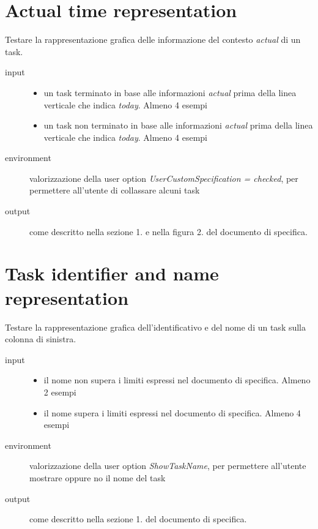 \section{Actual time representation}
Testare la rappresentazione grafica delle informazione del contesto
\emph{actual} di un task.
\begin{description}
\item[input]  \quad
\begin{itemize}
  \item un task terminato in base alle informazioni \emph{actual} prima della
  linea verticale che indica \emph{today}. Almeno 4 esempi
  \item un task non terminato in base alle informazioni \emph{actual} prima della
  linea verticale che indica \emph{today}. Almeno 4 esempi
\end{itemize}
\item[environment] valorizzazione della user option
\emph{UserCustomSpecification = checked}, per permettere all'utente di
collassare alcuni task
\item[output] come descritto nella sezione 1. e nella figura 2. del
documento di specifica.
\end{description}

\section{Task identifier and name representation}
Testare la rappresentazione grafica dell'identificativo e del nome di un task
sulla colonna di sinistra.
\begin{description}
\item[input]  \quad
\begin{itemize}
  \item il nome non supera i limiti espressi nel documento di specifica. Almeno
  2 esempi
  \item il nome supera i limiti espressi nel documento di specifica. Almeno 4 
  esempi
\end{itemize}
\item[environment] valorizzazione della user option
\emph{ShowTaskName}, per permettere all'utente mostrare oppure no il nome del
task
\item[output] come descritto nella sezione 1. del
documento di specifica.
\end{description}

